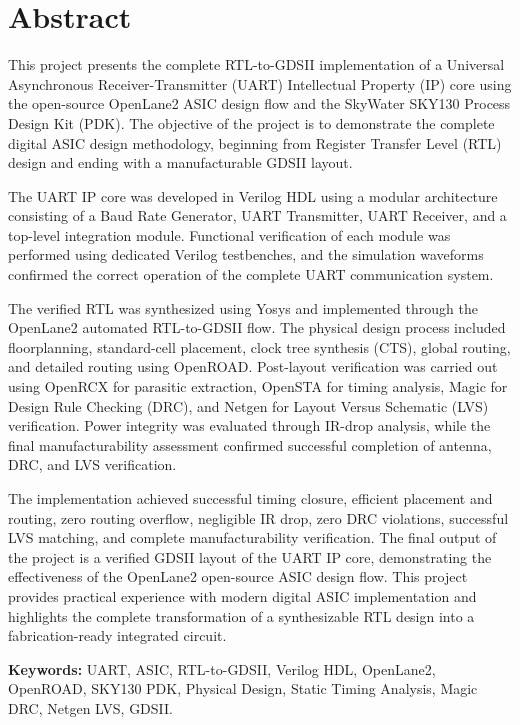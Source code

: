 \chapter*{Abstract}

This project presents the complete RTL-to-GDSII implementation of a Universal Asynchronous Receiver-Transmitter (UART) Intellectual Property (IP) core using the open-source OpenLane2 ASIC design flow and the SkyWater SKY130 Process Design Kit (PDK). The objective of the project is to demonstrate the complete digital ASIC design methodology, beginning from Register Transfer Level (RTL) design and ending with a manufacturable GDSII layout.

The UART IP core was developed in Verilog HDL using a modular architecture consisting of a Baud Rate Generator, UART Transmitter, UART Receiver, and a top-level integration module. Functional verification of each module was performed using dedicated Verilog testbenches, and the simulation waveforms confirmed the correct operation of the complete UART communication system.

The verified RTL was synthesized using Yosys and implemented through the OpenLane2 automated RTL-to-GDSII flow. The physical design process included floorplanning, standard-cell placement, clock tree synthesis (CTS), global routing, and detailed routing using OpenROAD. Post-layout verification was carried out using OpenRCX for parasitic extraction, OpenSTA for timing analysis, Magic for Design Rule Checking (DRC), and Netgen for Layout Versus Schematic (LVS) verification. Power integrity was evaluated through IR-drop analysis, while the final manufacturability assessment confirmed successful completion of antenna, DRC, and LVS verification.

The implementation achieved successful timing closure, efficient placement and routing, zero routing overflow, negligible IR drop, zero DRC violations, successful LVS matching, and complete manufacturability verification. The final output of the project is a verified GDSII layout of the UART IP core, demonstrating the effectiveness of the OpenLane2 open-source ASIC design flow. This project provides practical experience with modern digital ASIC implementation and highlights the complete transformation of a synthesizable RTL design into a fabrication-ready integrated circuit.

\vspace{1em}

\noindent\textbf{Keywords:} UART, ASIC, RTL-to-GDSII, Verilog HDL, OpenLane2, OpenROAD, SKY130 PDK, Physical Design, Static Timing Analysis, Magic DRC, Netgen LVS, GDSII.